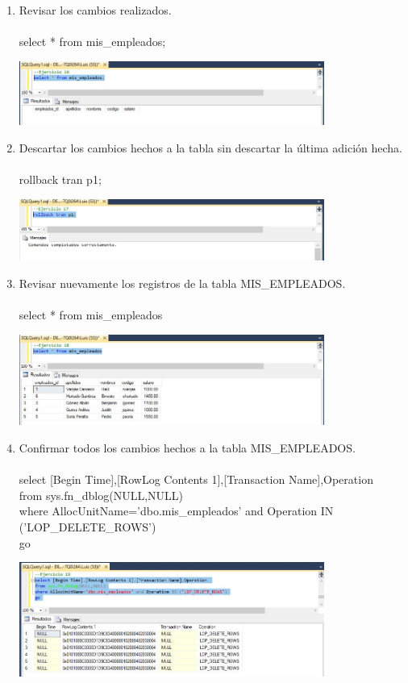 \begin{enumerate}[1.]
	\item Revisar los cambios realizados.
          \\
	\\select * from mis\_empleados;
	\begin{center}
	\includegraphics[width=10cm]{./Imagenes/1ejer16} 
	\end{center}

	\item Descartar los cambios hechos a la tabla sin descartar la última adición hecha.
          \\
	\\rollback tran p1;
	\begin{center}
	\includegraphics[width=10cm]{./Imagenes/1ejer17} 
	\end{center}

	\item Revisar nuevamente los registros de la tabla MIS\_EMPLEADOS.
          \\
	\\select * from mis\_empleados
	\begin{center}
	\includegraphics[width=10cm]{./Imagenes/1ejer18} 
	\end{center}

	\item Confirmar todos los cambios hechos a la tabla MIS\_EMPLEADOS.
          \\
          \\select [Begin Time],[RowLog Contents 1],[Transaction Name],Operation 
          \\from sys.fn\_dblog(NULL,NULL)
          \\where AllocUnitName='dbo.mis\_empleados' and Operation IN ('LOP\_DELETE\_ROWS')
          \\go
	\begin{center}
	\includegraphics[width=10cm]{./Imagenes/1ejer19} 
	\end{center}


\end{enumerate}
